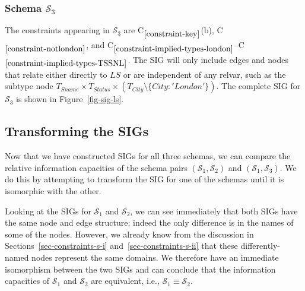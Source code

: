 \documentclass{sig-alternate-05-2015}
\newcounter{constraint}
\newcommand{\LS}{\ensuremath{\mathit{LS}}}
\newcommand{\Sname}{\ensuremath{\mathit{Sname}}}
\newcommand{\Status}{\ensuremath{\mathit{Status}}}
\newcommand{\City}{\ensuremath{\mathit{City}}}
\newcommand{\T}[1]{\ensuremath{T_{#1}}}
\newcommand{\CityLondon}{\ensuremath{\{\City\colon\allowbreak\mathit{'London'}\}}}
\newcommand{\TCityMinusLondon}{\ensuremath{\T{\City} \setminus \CityLondon}}
\newcommand{\TSSNL}{\ensuremath{\T{\Sname} \times \T{\Status} \times (\TCityMinusLondon)}}
\newcommand{\SC}[1]{\ensuremath{\mathcal{S}_{#1}}}
\newcommand{\Equivalent}[2]{\ensuremath{#1 \equiv #2}}
\newcommand{\Constraint}[2][]{C\ensuremath{_{#2}\ifx&#1&\else^{#1}\fi}}
\begin{document}




\subsubsection{Schema \(\SC{3}\)}
\label{sec-sigs-s-iii}

\noindent The constraints appearing in \(\SC{3}\) are \Constraint{\ref{constraint-key}}(b), \Constraint{\ref{constraint-notlondon}}, and \Constraint{\ref{constraint-implied-types-london}}--\Constraint{\ref{constraint-implied-types-TSSNL}}. The SIG will only include edges and nodes that relate either directly to \(\LS\) or are independent of any relvar, such as the subtype node \(\TSSNL\). The complete SIG for \(\SC{3}\) is shown in Figure~\ref{fig-sig-ls}.




\subsection{Transforming the SIGs}
\label{sec-transforming}

\noindent Now that we have constructed SIGs for all three schemas, we can compare the relative information capacities of the schema pairs \((\SC{1}, \SC{2})\) and \((\SC{1}, \SC{3})\). We do this by attempting to transform the SIG for one of the schemas until it is isomorphic with the other.

Looking at the SIGs for \(\SC{1}\) and \(\SC{2}\), we can see immediately that both SIGs have the same node and edge structure; indeed the only difference is in the names of some of the nodes. However, we already know from the discussion in Sections~\ref{sec-constraints-s-i} and~\ref{sec-constraints-s-ii} that these differently-named nodes represent the same domains. We therefore have an immediate isomorphism between the two SIGs and can conclude that the information capacities of \(\SC{1}\) and \(\SC{2}\) are equivalent, i.e., \(\Equivalent{\SC{1}}{\SC{2}}\).
\end{document}
